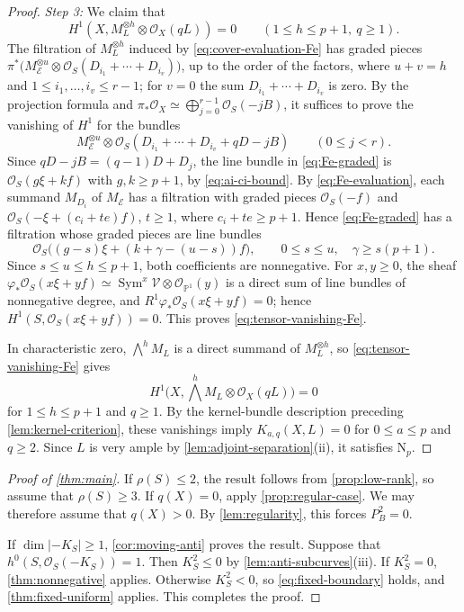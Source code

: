 \documentclass[11pt,reqno]{amsart}
\numberwithin{equation}{section}
\theoremstyle{remark}
\newcommand{\sshf}[1]{\mathcal{O}_{#1}}
\newcommand{\shf}[1]{\mathscr{#1}}
\newcommand{\prj}[1]{\mathbb{P}^{#1}}
\newcommand{\Sym}{\operatorname{Sym}}
\newcommand{\NP}{\mathrm N}
\begin{document}
\begin{proof}
\smallskip\noindent\emph{Step 3:} We claim that
\begin{equation}\label{eq:tensor-vanishing-Fe}
 H^1(X,M_L^{\otimes h}\otimes\sshf{X}(qL))=0
 \qquad(1\leq h\leq p+1,\ q\geq1).
\end{equation}
The filtration of \(M_L^{\otimes h}\) induced by \eqref{eq:cover-evaluation-Fe} has graded pieces \(\pi^*\bigl(M_{\shf{E}}^{\otimes u}\otimes\sshf{S}(D_{i_1}+\cdots+D_{i_v})\bigr)\), up to the order of the factors, where \(u+v=h\) and \(1\leq i_1,\dots,i_v\leq r-1\); for \(v=0\) the sum \(D_{i_1}+\cdots+D_{i_v}\) is zero. By the projection formula and \(\pi_*\sshf{X}\simeq\bigoplus_{j=0}^{r-1}\sshf{S}(-jB)\), it suffices to prove the vanishing of \(H^1\) for the bundles
\begin{equation}\label{eq:Fe-graded}
 M_{\shf{E}}^{\otimes u}\otimes
 \sshf{S}(D_{i_1}+\cdots+D_{i_v}+qD-jB)\qquad(0\leq j<r).
\end{equation}
Since \(qD-jB=(q-1)D+D_j\), the line bundle in \eqref{eq:Fe-graded} is \(\sshf{S}(g\xi+kf)\) with \(g,k\geq p+1\), by \eqref{eq:ai-ci-bound}. By \eqref{eq:Fe-evaluation}, each summand \(M_{D_i}\) of \(M_{\shf{E}}\) has a filtration with graded pieces \(\sshf{S}(-f)\) and \(\sshf{S}(-\xi+(c_i+te)f)\), \(t\geq1\), where \(c_i+te\geq p+1\). Hence \eqref{eq:Fe-graded} has a filtration whose graded pieces are line bundles
\begin{equation*}
 \sshf{S}\bigl((g-s)\xi+(k+\gamma-(u-s))f\bigr),
 \qquad 0\leq s\leq u,\quad \gamma\geq s(p+1).
\end{equation*}
Since \(s\leq u\leq h\leq p+1\), both coefficients are nonnegative. For \(x,y\geq0\), the sheaf \(\varphi_*\sshf{S}(x\xi+yf)\simeq\Sym^x\shf{V}\otimes\sshf{\prj{1}}(y)\) is a direct sum of line bundles of nonnegative degree, and \(R^1\varphi_*\sshf{S}(x\xi+yf)=0\); hence \(H^1(S,\sshf{S}(x\xi+yf))=0\). This proves \eqref{eq:tensor-vanishing-Fe}.

In characteristic zero, \(\bigwedge^hM_L\) is a direct summand of \(M_L^{\otimes h}\), so \eqref{eq:tensor-vanishing-Fe} gives \[H^1\bigl(X,\bigwedge^hM_L\otimes\sshf{X}(qL)\bigr)=0\] for \(1\leq h\leq p+1\) and \(q\geq1\). By the kernel-bundle description preceding
\cref{lem:kernel-criterion}, these vanishings imply
\(K_{a,q}(X,L)=0\) for \(0\leq a\leq p\) and \(q\geq2\). Since \(L\) is very ample by \cref{lem:adjoint-separation}\textup{(ii)}, it satisfies \(\NP_p\).
\end{proof}

\begin{proof}[Proof of \cref{thm:main}]
If \(\rho(S)\leq2\), the result follows from \cref{prop:low-rank}, so
assume that \(\rho(S)\geq3\). If \(q(X)=0\), apply
\cref{prop:regular-case}. We may therefore assume that \(q(X)>0\).
By \cref{lem:regularity}, this forces \(P_B^2=0\).

If \(\dim|-K_S|\geq1\), \cref{cor:moving-anti} proves the result.
Suppose that \(h^0(S,\sshf{S}(-K_S))=1\). Then \(K_S^2\leq0\) by
\cref{lem:anti-subcurves}\textup{(iii)}. If \(K_S^2=0\), \cref{thm:nonnegative} applies. Otherwise \(K_S^2<0\), so \eqref{eq:fixed-boundary} holds, and \cref{thm:fixed-uniform} applies. This completes the proof.
\end{proof}
\end{document}
